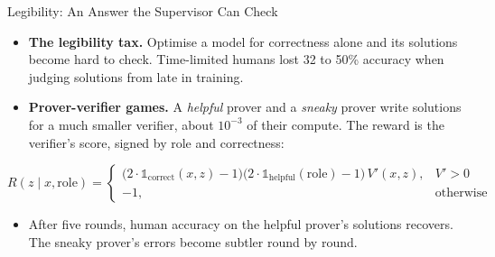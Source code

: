 \begin{frame}{Legibility: An Answer the Supervisor Can Check}
    \begin{itemize}\itemsep0.4em
        \item \textbf{The legibility tax.} Optimise a model for correctness alone and its solutions become hard to check. Time-limited humans lost \alert{32 to 50\%} accuracy when judging solutions from late in training.
        \item \textbf{Prover-verifier games.} A \emph{helpful} prover and a \emph{sneaky} prover write solutions for a much smaller verifier, about $10^{-3}$ of their compute. The reward is the verifier's score, signed by role and correctness:
    \end{itemize}
    \[
        R(z\mid x,\text{role})=
        \begin{cases}
            \big(2\cdot\mathbb{1}_{\text{correct}}(x,z)-1\big)\big(2\cdot\mathbb{1}_{\text{helpful}}(\text{role})-1\big)\,V'(x,z), & V'>0\\
            -1, & \text{otherwise}
        \end{cases}
    \]
    \begin{itemize}\itemsep0.4em
        \item After five rounds, human accuracy on the helpful prover's solutions recovers. The sneaky prover's errors become subtler round by round.
    \end{itemize}
    \vspace{0.2em}
\end{frame}

